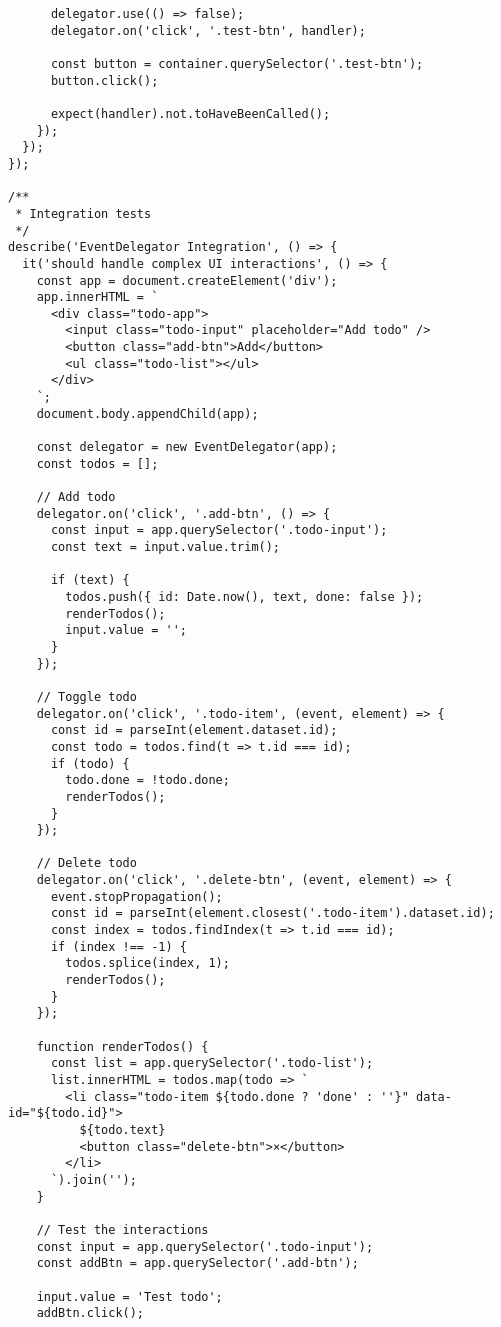 \documentclass[11pt]{article}
\begin{document}
\begin{verbatim}
      delegator.use(() => false);
      delegator.on('click', '.test-btn', handler);
      
      const button = container.querySelector('.test-btn');
      button.click();
      
      expect(handler).not.toHaveBeenCalled();
    });
  });
});

/**
 * Integration tests
 */
describe('EventDelegator Integration', () => {
  it('should handle complex UI interactions', () => {
    const app = document.createElement('div');
    app.innerHTML = `
      <div class="todo-app">
        <input class="todo-input" placeholder="Add todo" />
        <button class="add-btn">Add</button>
        <ul class="todo-list"></ul>
      </div>
    `;
    document.body.appendChild(app);
    
    const delegator = new EventDelegator(app);
    const todos = [];
    
    // Add todo
    delegator.on('click', '.add-btn', () => {
      const input = app.querySelector('.todo-input');
      const text = input.value.trim();
      
      if (text) {
        todos.push({ id: Date.now(), text, done: false });
        renderTodos();
        input.value = '';
      }
    });
    
    // Toggle todo
    delegator.on('click', '.todo-item', (event, element) => {
      const id = parseInt(element.dataset.id);
      const todo = todos.find(t => t.id === id);
      if (todo) {
        todo.done = !todo.done;
        renderTodos();
      }
    });
    
    // Delete todo
    delegator.on('click', '.delete-btn', (event, element) => {
      event.stopPropagation();
      const id = parseInt(element.closest('.todo-item').dataset.id);
      const index = todos.findIndex(t => t.id === id);
      if (index !== -1) {
        todos.splice(index, 1);
        renderTodos();
      }
    });
    
    function renderTodos() {
      const list = app.querySelector('.todo-list');
      list.innerHTML = todos.map(todo => `
        <li class="todo-item ${todo.done ? 'done' : ''}" data-id="${todo.id}">
          ${todo.text}
          <button class="delete-btn">×</button>
        </li>
      `).join('');
    }
    
    // Test the interactions
    const input = app.querySelector('.todo-input');
    const addBtn = app.querySelector('.add-btn');
    
    input.value = 'Test todo';
    addBtn.click();
    

\end{verbatim}
\end{document}
